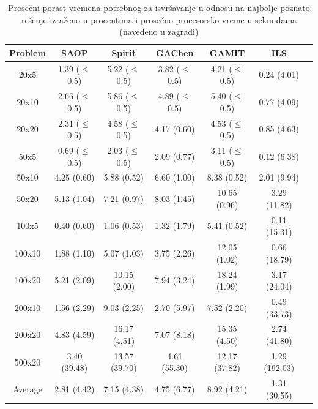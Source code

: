 \documentclass[a4paper]{article}
\begin{document}
\begin{table}[H]
\caption{Prosečni porast vremena potrebnog za isvršavanje u odnosu na najbolje poznato rešenje izraženo u procentima i prosečno procesorsko vreme u sekundama (navedeno u zagradi)
\cite{aComprehensiveReviewAndEvaluationOfPermutationFlowshopHeuristics}}
\label{tab:alg}
\begin{center}
 \begin{tabular}{c c c c c c c} 
 \hline
 Problem & SAOP & Spirit & GAChen & GAMIT & ILS &\\ [0.5ex] 
 \hline\hline
 20x5 & 1.39 ($\leq$0.5) & 5.22 ($\leq$0.5) & 3.82 ($\leq$0.5) & 4.21 ($\leq$0.5) & 0.24 (4.01) &\\ [1ex]
 \hline
 20x10 & 2.66 ($\leq$0.5) & 5.86 ($\leq$0.5) & 4.89 ($\leq$0.5) & 5.40 ($\leq$0.5) & 0.77 (4.09) &\\ [1ex]
 \hline
 20x20 & 2.31 ($\leq$0.5) & 4.58 ($\leq$0.5) & 4.17 (0.60) & 4.53 ($\leq$0.5) & 0.85 (4.63) &\\ [1ex]
 \hline
 50x5 & 0.69 ($\leq$0.5) & 2.03 ($\leq$0.5) & 2.09 (0.77) & 3.11 ($\leq$0.5) & 0.12 (6.38) &\\ [1ex]
 \hline
 50x10 & 4.25 (0.60) & 5.88 (0.52) & 6.60 (1.00) & 8.38 (0.52) & 2.01 (9.94) &\\ [1ex] 
 \hline
 50x20 & 5.13 (1.04) & 7.21 (0.97) & 8.03 (1.45) & 10.65 (0.96) & 3.29 (11.82) &\\ [1ex] 
 \hline
 100x5 & 0.40 (0.60) & 1.06 (0.53) & 1.32 (1.79) & 5.41 (0.52) & 0.11 (15.31) &\\ [1ex] 
 \hline
 100x10 & 1.88 (1.10) & 5.07 (1.03) & 3.75 (2.26) & 12.05 (1.02) & 0.66 (18.79) &\\ [1ex] 
 \hline
 100x20 & 5.21 (2.09) & 10.15 (2.00) & 7.94 (3.24) &18.24 (1.99) & 3.17 (24.04) &\\ [1ex] 
 \hline
 200x10 & 1.56 (2.29) & 9.03 (2.25) & 2.70 (5.97) & 7.52 (2.20) & 0.49 (33.73) &\\ [1ex] 
 \hline
 200x20 & 4.83 (4.59) & 16.17 (4.51) & 7.07 (8.18) & 15.35 (4.50) & 2.74 (41.80) &\\ [1ex] 
 \hline
 500x20 & 3.40 (39.48) & 13.57 (39.70) & 4.61 (55.30) & 12.17 (37.82) & 1.29 (192.03) &\\ [1ex] 
 \hline
 \hline
 Average & 2.81 (4.42) & 7.15 (4.38) & 4.75 (6.77) & 8.92 (4.21) & 1.31 (30.55) &\\ [1ex] 
 \hline
 \end{tabular}
\end{center}
\end{table}
\end{document}
